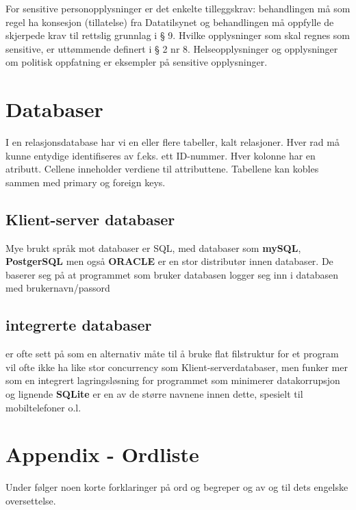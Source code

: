 \documentclass[11pt]{article}
\begin{document}
   For sensitive personopplysninger er det enkelte tilleggskrav:
   behandlingen må som regel ha konsesjon (tillatelse) fra Datatilsynet og behandlingen
   må oppfylle de skjerpede krav til rettslig grunnlag i § 9. Hvilke opplysninger som
   skal regnes som sensitive, er uttømmende definert i § 2 nr 8. Helseopplysninger og
   opplysninger om politisk oppfatning er eksempler på sensitive opplysninger.
\section{Databaser}
\label{sec-18}

  I en relasjonsdatabase har vi en eller flere tabeller, kalt relasjoner. 
  Hver rad må kunne entydige identifiseres av f.eks. ett ID-nummer. Hver kolonne
  har en atributt. Cellene inneholder verdiene til attributtene. Tabellene kan 
  kobles sammen med primary og foreign keys. 
\subsection{Klient-server databaser}
\label{sec-18.1}

   Mye brukt språk mot databaser er SQL, med databaser som \textbf{mySQL}, \textbf{PostgerSQL}
   men også \textbf{ORACLE} er en stor distributør innen databaser. De baserer seg på at
   programmet som bruker databasen logger seg inn i databasen med brukernavn/passord
\subsection{integrerte databaser}
\label{sec-18.2}

   er ofte sett på som en alternativ måte til å bruke flat filstruktur for et program
   vil ofte ikke ha like stor concurrency som Klient-serverdatabaser, men funker mer
   som en integrert lagringsløsning for programmet som minimerer datakorrupsjon og 
   lignende \textbf{SQLite} er en av de større navnene innen dette, spesielt til mobiltelefoner 
   o.l.
\section{Appendix - Ordliste}
\label{sec-19}

  Under følger noen korte forklaringer på ord og begreper og av og til dets engelske oversettelse.
\end{document}
